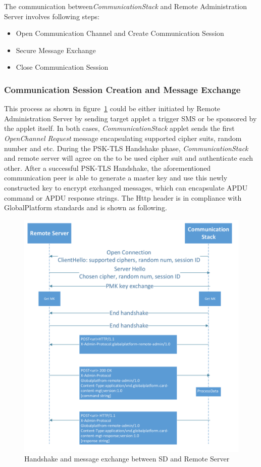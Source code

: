 The communication between\emph{CommunicationStack} and Remote Administration Server involves following steps:

 \begin{itemize}
  \item Open Communication Channel and Create Communication Session
  \item Secure Message Exchange
  \item Close Communication Session
\end{itemize}
\subsubsection{Communication Session Creation and Message Exchange}
This process as shown in figure~\ref{fig:communication-flow} could be either initiated by Remote Administration Server by sending target applet a trigger SMS or be sponsored by the applet itself. In both cases, \emph{CommunicationStack} applet sends the first \emph{OpenChannel Request} message encapsulating supported cipher suits, random number and etc. During the PSK-TLS Handshake phase,    \emph{CommunicationStack} and remote server will agree on the to be used cipher suit and authenticate each other. After a successful PSK-TLS Handshake, the aforementioned communication peer is able to generate a master key and use this newly constructed key to encrypt exchanged messages, which can encapsulate APDU command or APDU response strings. The Http header is in compliance with GlobalPlatform standards and is shown as following.


\begin{figure}[!htb]
	\centering
	\includegraphics[width=1\textwidth]{communication-flow}
		\caption{Handshake and message exchange between SD and Remote Server}
	\label{fig:communication-flow}
\end{figure}

